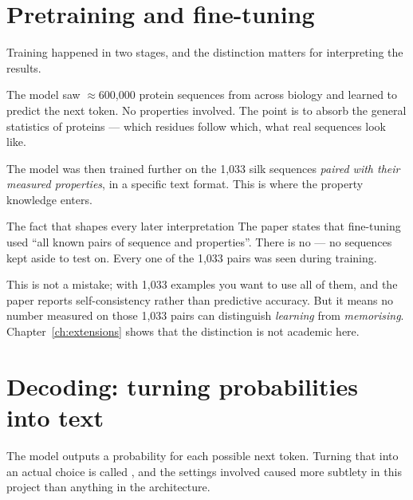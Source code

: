 \section{Pretraining and fine-tuning}

Training happened in two stages, and the distinction matters for interpreting
the results.

\begin{description}[leftmargin=0cm,style=nextline,itemsep=5pt]
\item[Pretraining.] The model saw $\approx$600{,}000 protein sequences from
  across biology and learned to predict the next token. No properties involved.
  The point is to absorb the general statistics of proteins --- which residues
  follow which, what real sequences look like.

\item[Fine-tuning.] The model was then trained further on the 1{,}033 silk
  sequences \emph{paired with their measured properties}, in a specific text
  format. This is where the property knowledge enters.
\end{description}

\begin{warnbox}{The fact that shapes every later interpretation}
The paper states that fine-tuning used ``all known pairs of sequence and
properties''. There is no  --- no sequences kept aside to
test on. Every one of the 1{,}033 pairs was seen during training.

This is not a mistake; with 1{,}033 examples you want to use all of them, and
the paper reports self-consistency rather than predictive accuracy. But it means
no number measured on those 1{,}033 pairs can distinguish \emph{learning} from
\emph{memorising}. Chapter~\ref{ch:extensions} shows that the distinction is
not academic here.
\end{warnbox}

\section{Decoding: turning probabilities into text}
\label{sec:decoding}

The model outputs a probability for each possible next token. Turning that into
an actual choice is called , and the settings involved caused
more subtlety in this project than anything in the architecture.


